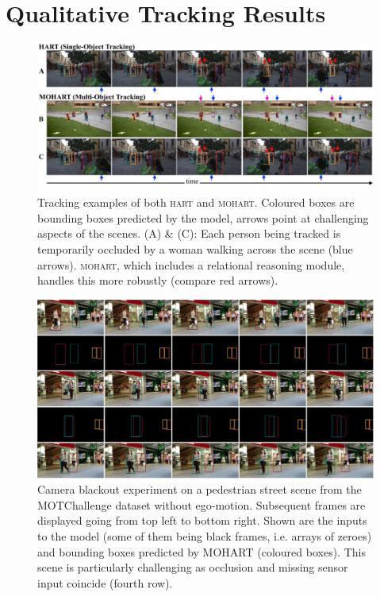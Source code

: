 \section{Qualitative Tracking Results}
\label{sec:blackout}


\begin{figure}[ht!]
\centering
\includegraphics[width=1\textwidth]{figures/MOHART/tracking_qualitative.pdf}
\vspace{-8mm}
\caption{Tracking examples of both \textsc{hart} and \textsc{mohart}. Coloured boxes are bounding boxes predicted by the model, arrows point at challenging aspects of the scenes. (A) \& (C): Each person being tracked is temporarily occluded by a woman walking across the scene (blue arrows). \textsc{mohart}, which includes a relational reasoning module, handles this more robustly (compare red arrows).
\vspace{-4mm}}
\label{fig:tracking_and_predicting}
\end{figure}


\begin{figure}
	\centering
	\includegraphics[width=1.0\textwidth]{figures/MOHART/mot_example1.png}
	\vspace{-6mm}
	\caption{Camera blackout experiment on a pedestrian street scene from the MOTChallenge dataset without ego-motion. Subsequent frames are displayed going from top left to bottom right. Shown are the inputs to the model (some of them being black frames, i.e. arrays of zeroes) and bounding boxes predicted by \textsc{MOHART} (coloured boxes). This scene is particularly challenging as occlusion and missing sensor input coincide (fourth row).
		\vspace{-2mm}}
	\label{fig:blackout1}
\end{figure}

